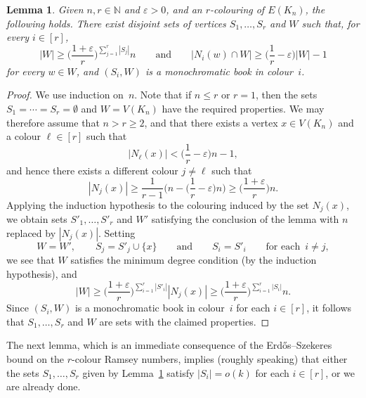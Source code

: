 \documentclass[12pt,reqno]{amsart}
\newtheorem{lemma}[theorem]{Lemma}
\theoremstyle{definition}
\theoremstyle{remark}
\newcommand\N{\mathbb{N}}
\newcommand\eps{\varepsilon}
\renewcommand{\le}{\leqslant}
\renewcommand{\ge}{\geqslant}
\def\eps{\varepsilon}
\def\N{\mathbb{N}}
\begin{document}
%
\begin{lemma}
	\label{lem:ESz:steps}
	Given\/ \(n,r \in \N\) and\/ \(\eps > 0\), and an \(r\)-colouring of \(E(K_n)\), the following holds. There exist disjoint sets of vertices\/ \(S_1,\dots,S_r\) and\/ \(W\) such that, for every \(i \in [r]\),
	\begin{equation*}
		|W| \ge \bigg( \frac{1+\eps}{r} \bigg)^{\sum_{j = 1}^r |S_j|} n \qquad \text{and} \qquad |N_i(w) \cap W| \ge \bigg( \frac{1}{r} - \eps \bigg) |W| - 1
	\end{equation*}
	for every \(w \in W\), and \((S_i,W)\) is a monochromatic book in colour~\(i\).
\end{lemma}
%
\begin{proof}
	We use induction on~\(n\). Note that if \(n \le r\) or \(r = 1\), then the sets \(S_1 = \cdots = S_r = \emptyset\) and \(W = V(K_n)\) have the required properties. We may therefore assume that \(n > r \ge 2\), and that there exists a vertex \(x \in V(K_n)\) and a colour \(\ell \in [r]\) such that
	\begin{equation*}
		|N_\ell(x)| < \bigg( \frac{1}{r} - \eps \bigg) n - 1,
	\end{equation*}
	and hence there exists a different colour \(j \ne \ell\) such that
	\begin{equation*}
		|N_j(x)| \ge \frac{1}{r-1} \bigg( n - \bigg( \frac{1}{r} - \eps \bigg) n \bigg) \ge \bigg( \frac{1 + \eps}{r} \bigg) n.
	\end{equation*}
	Applying the induction hypothesis to the colouring induced by the set \(N_j(x)\), we obtain sets \(S'_1,\ldots,S'_r\) and \(W'\) satisfying the conclusion of the lemma with \(n\) replaced by \(|N_j(x)|\). Setting
	\begin{equation*}
		W = W', \qquad S_j = S'_j \cup \{x\} \qquad \text{and} \qquad S_i = S'_i \qquad \text{for each } \, i \ne j,
	\end{equation*}
	we see that \(W\) satisfies the minimum degree condition (by the induction hypothesis), and
	\begin{equation*}
		|W| \ge \bigg( \frac{1+\eps}{r} \bigg)^{\sum_{i = 1}^r |S'_i|}|N_j(x)| \ge \bigg( \frac{1+\eps}{r} \bigg)^{\sum_{i=1}^r |S_i|}n.
	\end{equation*}
	Since \((S_i,W)\) is a monochromatic book in colour~\(i\) for each \(i \in [r]\), it follows that \(S_1,\dots,S_r\) and \(W\) are sets with the claimed properties.
\end{proof}
%

The next lemma, which is an immediate consequence of the Erd\H{o}s--Szekeres bound on the \(r\)-colour Ramsey numbers, implies (roughly speaking) that either the sets \(S_1,\dots,S_r\) given by Lemma~\ref{lem:ESz:steps} satisfy \(|S_i| = o(k)\) for each \(i \in [r]\), or we are already done.
\end{document}
